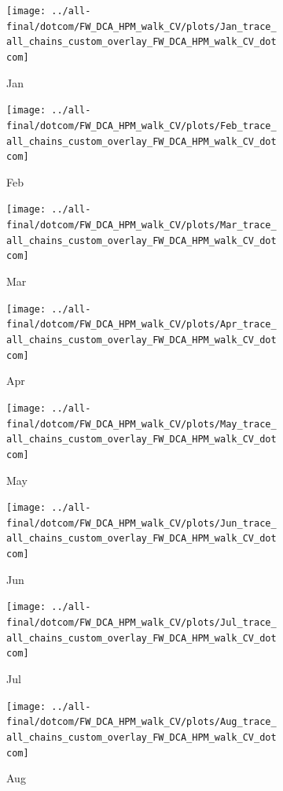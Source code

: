 \documentclass[ngerman]{ttlab-qualify}
\begin{document}
\newpage
\begin{figure}[H]
\centering
  \begin{subfigure}{.3\linewidth}
  \texttt{[image: ../all-final/dotcom/FW\_DCA\_HPM\_walk\_CV/plots/Jan\_trace\_all\_chains\_custom\_overlay\_FW\_DCA\_HPM\_walk\_CV\_dotcom]}\hfill
  \caption{Jan}
  \end{subfigure}
  \begin{subfigure}{.3\linewidth}
  \texttt{[image: ../all-final/dotcom/FW\_DCA\_HPM\_walk\_CV/plots/Feb\_trace\_all\_chains\_custom\_overlay\_FW\_DCA\_HPM\_walk\_CV\_dotcom]}\hfill
  \caption{Feb}
  \end{subfigure}
  \begin{subfigure}{.3\linewidth}
  \texttt{[image: ../all-final/dotcom/FW\_DCA\_HPM\_walk\_CV/plots/Mar\_trace\_all\_chains\_custom\_overlay\_FW\_DCA\_HPM\_walk\_CV\_dotcom]}\hfill
  \caption{Mar}
  \end{subfigure}\par\medskip
  \begin{subfigure}{.3\linewidth}
  \texttt{[image: ../all-final/dotcom/FW\_DCA\_HPM\_walk\_CV/plots/Apr\_trace\_all\_chains\_custom\_overlay\_FW\_DCA\_HPM\_walk\_CV\_dotcom]}\hfill
  \caption{Apr}
  \end{subfigure}
  \begin{subfigure}{.3\linewidth}
  \texttt{[image: ../all-final/dotcom/FW\_DCA\_HPM\_walk\_CV/plots/May\_trace\_all\_chains\_custom\_overlay\_FW\_DCA\_HPM\_walk\_CV\_dotcom]}\hfill
  \caption{May}
  \end{subfigure}
  \begin{subfigure}{.3\linewidth}
  \texttt{[image: ../all-final/dotcom/FW\_DCA\_HPM\_walk\_CV/plots/Jun\_trace\_all\_chains\_custom\_overlay\_FW\_DCA\_HPM\_walk\_CV\_dotcom]}\hfill
  \caption{Jun}
  \end{subfigure}\par\medskip
  \begin{subfigure}{.3\linewidth}
  \texttt{[image: ../all-final/dotcom/FW\_DCA\_HPM\_walk\_CV/plots/Jul\_trace\_all\_chains\_custom\_overlay\_FW\_DCA\_HPM\_walk\_CV\_dotcom]}\hfill
  \caption{Jul}
  \end{subfigure}
  \begin{subfigure}{.3\linewidth}
  \texttt{[image: ../all-final/dotcom/FW\_DCA\_HPM\_walk\_CV/plots/Aug\_trace\_all\_chains\_custom\_overlay\_FW\_DCA\_HPM\_walk\_CV\_dotcom]}\hfill
  \caption{Aug}
  \end{subfigure}
  \begin{subfigure}{.3\linewidth}

\end{subfigure}
\end{figure}
\end{document}
